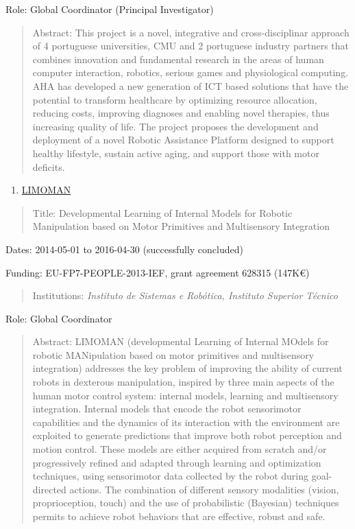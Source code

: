 \documentclass[
]{article}
\begin{document}
Role: Global Coordinator (Principal Investigator)

\begin{quote}
Abstract: This project is a novel, integrative and cross-disciplinar
approach of 4 portuguese universities, CMU and 2 portuguese industry
partners that combines innovation and fundamental research in the areas
of human computer interaction, robotics, serious games and physiological
computing. AHA has developed a new generation of ICT based solutions
that have the potential to transform healthcare by optimizing resource
allocation, reducing costs, improving diagnoses and enabling novel
therapies, thus increasing quality of life. The project proposes the
development and deployment of a novel Robotic Assistance Platform
designed to support healthy lifestyle, sustain active aging, and support
those with motor deficits.
\end{quote}

\begin{enumerate}
\def\labelenumi{\arabic{enumi}.}
\setcounter{enumi}{4}
\item
  \ul{LIMOMAN}
\end{enumerate}

\begin{quote}
Title: Developmental Learning of Internal Models for Robotic
Manipulation based on Motor Primitives and Multisensory Integration
\end{quote}

Dates: 2014-05-01 to 2016-04-30 (successfully concluded)

Funding: EU-FP7-PEOPLE-2013-IEF, grant agreement 628315 (147K€)

\begin{quote}
Institutions: \emph{Instituto de Sistemas e Robótica, Instituto Superior
Técnico}
\end{quote}

Role: Global Coordinator

\begin{quote}
Abstract: LIMOMAN (developmental Learning of Internal MOdels for robotic
MANipulation based on motor primitives and multisensory integration)
addresses the key problem of improving the ability of current robots in
dexterous manipulation, inspired by three main aspects of the human
motor control system: internal models, learning and multisensory
integration. Internal models that encode the robot sensorimotor
capabilities and the dynamics of its interaction with the environment
are exploited to generate predictions that improve both robot perception
and motion control. These models are either acquired from scratch and/or
progressively refined and adapted through learning and optimization
techniques, using sensorimotor data collected by the robot during
goal-directed actions. The combination of different sensory modalities
(vision, proprioception, touch) and the use of probabilistic (Bayesian)
techniques permits to achieve robot behaviors that are effective, robust
and safe.
\end{quote}
\end{document}
